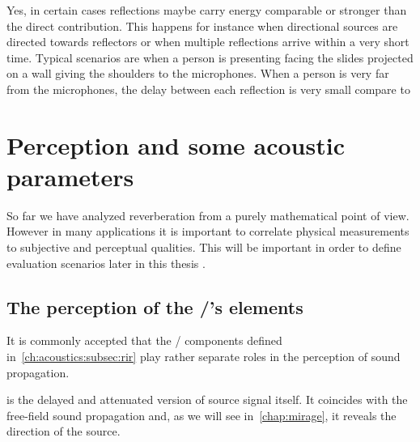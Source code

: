  Yes, in certain cases reflections maybe carry energy comparable or stronger than the direct contribution.
This happens for instance when directional sources are directed towards reflectors or when multiple reflections arrive within a very short time.
Typical scenarios are when a person is presenting facing the slides projected on a wall giving the shoulders to the microphones.
When a person is very far from the microphones, the delay between each reflection is very small compare to


\section{Perception and some acoustic parameters}\label{ch:acoustics:sec:perception}
So far we have analyzed reverberation from a purely mathematical point of view.
However in many applications it is important to correlate physical measurements to subjective and perceptual qualities.
This will be important in order to define evaluation scenarios later in this thesis
.
\subsection{The perception of the \RIR/'s elements}
It is commonly accepted that the \RIR/ components defined in~\cref{ch:acoustics:subsec:rir} play rather separate roles in the perception of sound propagation.

 is the delayed and attenuated version of source signal itself.
It coincides with the free-field sound propagation and, as we will see in~\cref{chap:mirage}, it reveals the direction of the source.

